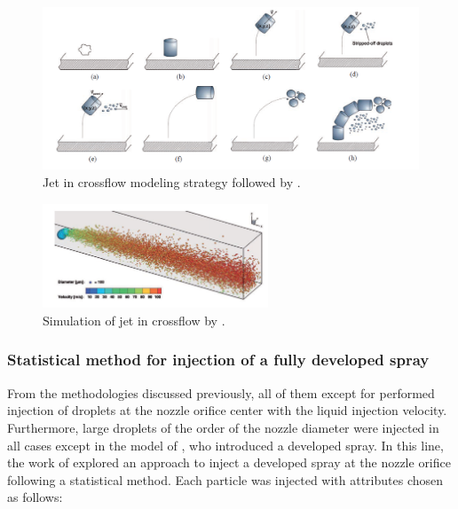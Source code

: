 \begin{figure}[ht]
    \centering
    \includegraphics[width=1.0\textwidth]{./part1_numerical_approaches/figures_ch3/eckel_2016_modeling_strategy}
       \centering
    \caption{Jet in crossflow modeling strategy followed by .}
    \label{fig:eckel_2016_modeling_strategy}
\end{figure}

\begin{figure}[ht]
    \centering
    \includegraphics[width=0.6\textwidth]{./part1_numerical_approaches/figures_ch3/eckel_2016_jet}
       \centering
    \caption{Simulation of jet in crossflow by .}
    \label{fig:eckel_2016_jet}
\end{figure}


\subsubsection*{Statistical method for injection of a fully developed spray }

From the methodologies discussed previously, all of them except for  performed injection of droplets at the nozzle orifice center with the liquid injection velocity. Furthermore, large droplets of the order of the nozzle diameter were injected in all cases except in the model of , who introduced a developed spray. In this line, the work of  explored an approach to inject a developed spray at the nozzle orifice following a statistical method. Each particle was injected with attributes chosen as follows:

